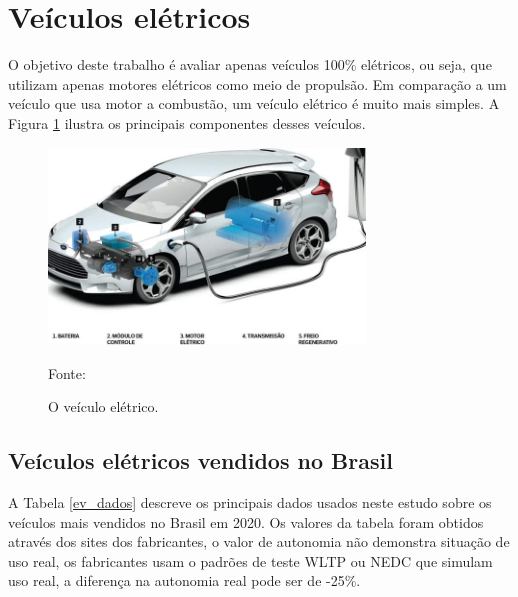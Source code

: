 
\section{Veículos elétricos}\label{ev}

O objetivo deste trabalho é avaliar apenas veículos 100\% elétricos, ou seja, que utilizam apenas motores elétricos como meio de propulsão. Em comparação a um veículo que usa motor a combustão, um veículo elétrico é muito mais simples. A Figura \ref{fig:ev_partes} ilustra os principais componentes desses veículos.

\begin{figure}[H]
    \centering
    \includegraphics[width=0.75\textwidth]{./Figuras/ev_partes.jpg}
    \caption{O veículo elétrico.}{Fonte: \cite{industriahoje}}
   \label{fig:ev_partes}
\end{figure}

\subsection{Veículos elétricos vendidos no Brasil}

A Tabela \ref{ev_dados} descreve os principais dados usados neste estudo sobre os veículos mais vendidos no Brasil em 2020. Os valores da tabela foram obtidos através dos sites dos fabricantes, o valor de autonomia não demonstra situação de uso real, os fabricantes usam o padrões de teste WLTP ou NEDC que simulam uso real, a diferença na autonomia real pode ser de -25\%.

